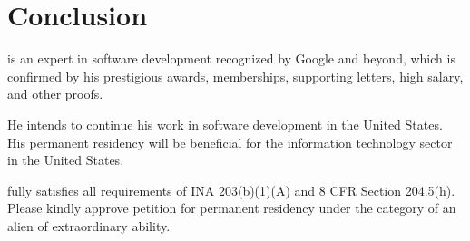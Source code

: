 \section{Conclusion}
\label{sec:Conclusion}

\mrl is an expert in software development recognized by Google and beyond,
which is confirmed by his prestigious awards, memberships, supporting letters,
high salary, and other proofs.

He intends to continue his work in software development in the United States.
His permanent residency will be beneficial for the information technology sector in the United States.

\mrl fully satisfies all requirements of INA 203(b)(1)(A) and 8 CFR Section 204.5(h).
Please kindly approve \mrls petition for permanent residency under the category of an alien of extraordinary ability.

\pagebreak
